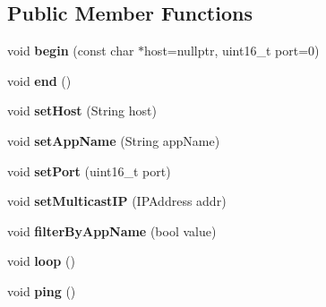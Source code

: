 \subsection*{Public Member Functions}
\begin{DoxyCompactItemize}
\item 
\mbox{\label{class_e_s_pdevice_finder_a539a9d277870c704fd16c3489734ea37}} 
void {\bfseries begin} (const char $\ast$host=nullptr, uint16\+\_\+t port=0)
\item 
\mbox{\label{class_e_s_pdevice_finder_adfd99b6f9fbb3f5f05eb7af1c73faa21}} 
void {\bfseries end} ()
\item 
\mbox{\label{class_e_s_pdevice_finder_a562a409039e8e51c690669c7be3d44c6}} 
void {\bfseries set\+Host} (String host)
\item 
\mbox{\label{class_e_s_pdevice_finder_a42ceb57b393c73104b2326d3b01be2ab}} 
void {\bfseries set\+App\+Name} (String app\+Name)
\item 
\mbox{\label{class_e_s_pdevice_finder_ac3d5d4e47e6e74f4ebbf58edd1b5df86}} 
void {\bfseries set\+Port} (uint16\+\_\+t port)
\item 
\mbox{\label{class_e_s_pdevice_finder_abdb88ce6e272673b4ad53d2e60ef4d38}} 
void {\bfseries set\+Multicast\+IP} (I\+P\+Address addr)
\item 
\mbox{\label{class_e_s_pdevice_finder_a24122d858746c2a78263643749744f63}} 
void {\bfseries filter\+By\+App\+Name} (bool value)
\item 
\mbox{\label{class_e_s_pdevice_finder_a70330e8122313e4fd6758c157dde9eb9}} 
void {\bfseries loop} ()
\item 
\mbox{\label{class_e_s_pdevice_finder_a1d04d6073b194a78cffa11738bef8a1a}} 
void {\bfseries ping} ()
\item 
\mbox{\label{class_e_s_pdevice_finder_a4a91d0e2f05a76d2d73a9ecc5bb53d3a}} 

\end{DoxyCompactItemize}
